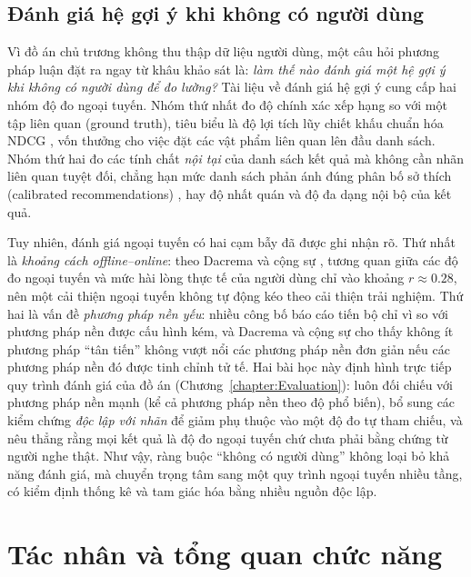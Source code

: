 \documentclass[../DoAn.tex]{subfiles}
\begin{document}
\subsection{Đánh giá hệ gợi ý khi không có người dùng}
\label{subsection:2.1.5}
Vì đồ án chủ trương không thu thập dữ liệu người dùng, một câu hỏi phương pháp luận đặt ra ngay từ khâu khảo sát là: \textit{làm thế nào đánh giá một hệ gợi ý khi không có người dùng để đo lường?} Tài liệu về đánh giá hệ gợi ý cung cấp hai nhóm độ đo ngoại tuyến. Nhóm thứ nhất đo độ chính xác xếp hạng so với một tập liên quan (ground truth), tiêu biểu là độ lợi tích lũy chiết khấu chuẩn hóa NDCG \cite{jarvelin2002ndcg}, vốn thưởng cho việc đặt các vật phẩm liên quan lên đầu danh sách. Nhóm thứ hai đo các tính chất \textit{nội tại} của danh sách kết quả mà không cần nhãn liên quan tuyệt đối, chẳng hạn mức danh sách phản ánh đúng phân bố sở thích (calibrated recommendations) \cite{steck2018calibrated}, hay độ nhất quán và độ đa dạng nội bộ của kết quả.

Tuy nhiên, đánh giá ngoại tuyến có hai cạm bẫy đã được ghi nhận rõ. Thứ nhất là \textit{khoảng cách offline--online}: theo Dacrema và cộng sự \cite{dacrema2019progress}, tương quan giữa các độ đo ngoại tuyến và mức hài lòng thực tế của người dùng chỉ vào khoảng $r \approx 0.28$, nên một cải thiện ngoại tuyến không tự động kéo theo cải thiện trải nghiệm. Thứ hai là vấn đề \textit{phương pháp nền yếu}: nhiều công bố báo cáo tiến bộ chỉ vì so với phương pháp nền được cấu hình kém, và Dacrema và cộng sự cho thấy không ít phương pháp ``tân tiến'' không vượt nổi các phương pháp nền đơn giản nếu các phương pháp nền đó được tinh chỉnh tử tế. Hai bài học này định hình trực tiếp quy trình đánh giá của đồ án (Chương~\ref{chapter:Evaluation}): luôn đối chiếu với phương pháp nền mạnh (kể cả phương pháp nền theo độ phổ biến), bổ sung các kiểm chứng \textit{độc lập với nhãn} để giảm phụ thuộc vào một độ đo tự tham chiếu, và nêu thẳng rằng mọi kết quả là độ đo ngoại tuyến chứ chưa phải bằng chứng từ người nghe thật. Như vậy, ràng buộc ``không có người dùng'' không loại bỏ khả năng đánh giá, mà chuyển trọng tâm sang một quy trình ngoại tuyến nhiều tầng, có kiểm định thống kê và tam giác hóa bằng nhiều nguồn độc lập.

\section{Tác nhân và tổng quan chức năng}
\label{section:2.2}
\end{document}
